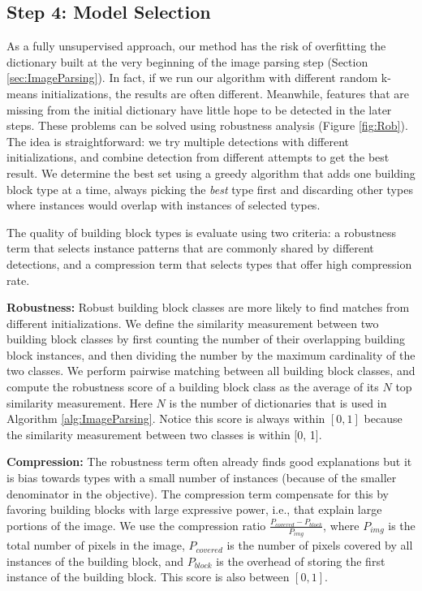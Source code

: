 \documentclass{acmtog}
\begin{document}
\subsection{Step 4: Model Selection}
\label{sec:ModelSelection}

As a fully unsupervised approach, our method has the risk of overfitting the dictionary built at the very beginning of the image parsing step (Section \ref{sec:ImageParsing}). In fact, if we run our algorithm with different random k-means initializations, the results are often different. Meanwhile, features that are missing from the initial dictionary have little hope to be detected in the later steps. These problems can be solved using robustness analysis (Figure \ref{fig:Rob}). The idea is straightforward: we try multiple detections with different initializations, and combine detection from different attempts to get the best result. %
We determine the best set using a greedy algorithm that adds one building block type at a time, always picking the \emph{best} type first and discarding other types where instances would overlap with instances of selected types.

The quality of building block types is evaluate using two criteria: a robustness term that selects instance patterns that are commonly shared by different detections, and a compression term that selects types that offer high compression rate.

\textbf{Robustness:} Robust building block classes are more likely to find matches from different initializations. We define the similarity measurement between two building block classes by first counting the number of their overlapping building block instances, and then dividing the number by the maximum cardinality of the two classes. We perform pairwise matching between all building block classes, and compute the robustness score of a building block class as the average of its $N$ top similarity measurement. Here $N$ is the number of dictionaries that is used in Algorithm \ref{alg:ImageParsing}. Notice this score is always within $[0, 1]$ because the similarity measurement between two classes is within [0, 1].

\textbf{Compression:} The robustness term often already finds good explanations but it is bias towards types with a small number of instances (because of the smaller denominator in the objective). The compression term compensate for this by favoring building blocks with large expressive power, i.e., that explain large portions of the image. We use the compression ratio $\frac{P_{covered} - P_{block}}{P_{img}}$, where $P_{img}$ is the total number of pixels in the image, $P_{covered}$ is the number of pixels covered by all instances of the building block, and $P_{block}$ is the overhead of storing the first instance of the building block. This score is also between $[0, 1]$.
\end{document}
